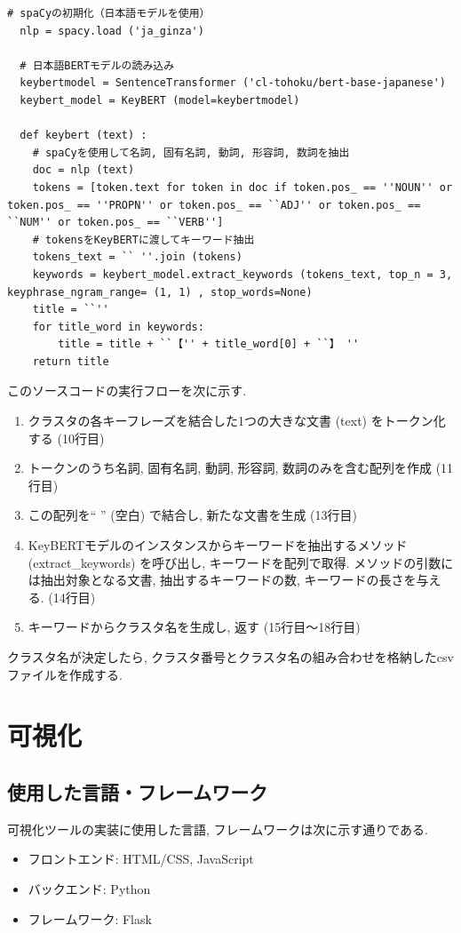 \begin{lstlisting}[caption=keybert関数, label=keybert]
  # spaCyの初期化（日本語モデルを使用）
  nlp = spacy.load ('ja_ginza') 

  # 日本語BERTモデルの読み込み
  keybertmodel = SentenceTransformer ('cl-tohoku/bert-base-japanese') 
  keybert_model = KeyBERT (model=keybertmodel) 

  def keybert (text) :
    # spaCyを使用して名詞, 固有名詞, 動詞, 形容詞, 数詞を抽出
    doc = nlp (text) 
    tokens = [token.text for token in doc if token.pos_ == ''NOUN'' or token.pos_ == ''PROPN'' or token.pos_ == ``ADJ'' or token.pos_ == ``NUM'' or token.pos_ == ``VERB'']
    # tokensをKeyBERTに渡してキーワード抽出
    tokens_text = `` ''.join (tokens) 
    keywords = keybert_model.extract_keywords (tokens_text, top_n = 3, keyphrase_ngram_range= (1, 1) , stop_words=None) 
    title = ``''
    for title_word in keywords:
        title = title + ``【'' + title_word[0] + ``】 ''
    return title
\end{lstlisting}

このソースコードの実行フローを次に示す. 

\begin{enumerate}
  \item クラスタの各キーフレーズを結合した1つの大きな文書 (text) をトークン化する (10行目)
  \item トークンのうち名詞, 固有名詞, 動詞, 形容詞, 数詞のみを含む配列を作成 (11行目)
  \item この配列を`` '' (空白) で結合し, 新たな文書を生成 (13行目)
  \item KeyBERTモデルのインスタンスからキーワードを抽出するメソッド (extract\_keywords) を呼び出し, キーワードを配列で取得. メソッドの引数には抽出対象となる文書, 抽出するキーワードの数, キーワードの長さを与える. (14行目)
  \item キーワードからクラスタ名を生成し, 返す (15行目〜18行目)
\end{enumerate}

クラスタ名が決定したら, クラスタ番号とクラスタ名の組み合わせを格納したcsvファイルを作成する. 


\section{可視化}\label{display}
\subsection{使用した言語・フレームワーク}
可視化ツールの実装に使用した言語, フレームワークは次に示す通りである. 
\begin{itemize}
    \item フロントエンド: HTML/CSS, JavaScript
    \item バックエンド: Python
    \item フレームワーク: Flask
\end{itemize}


